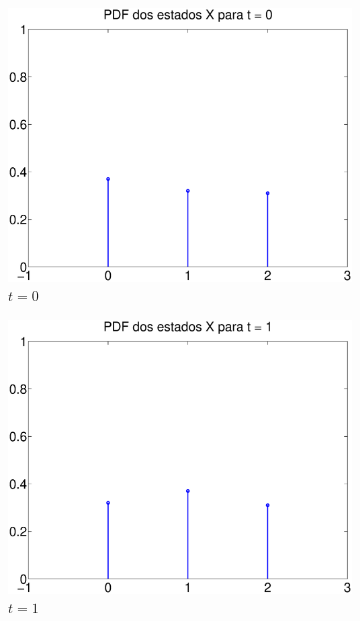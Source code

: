 \documentclass{report}
\begin{document}
\begin{figure}[H]
	\centering
	\begin{subfigure}{0.4\textwidth}
		\centering
		\includegraphics[width = \textwidth]{Q1_d_pdf_x_0}
		\caption{$t = 0$}
	\end{subfigure}
	\begin{subfigure}{0.4\textwidth}
		\centering
		\includegraphics[width = \textwidth]{Q1_d_pdf_x_1}
		\caption{$t = 1$}
	\end{subfigure}
	\begin{subfigure}{0.4\textwidth}
		\centering

\end{subfigure}
\end{figure}
\end{document}
